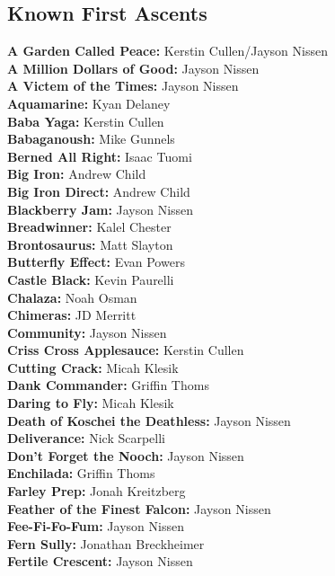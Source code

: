 \begin{flushleft}
\section{Known First Ascents}
\textbf{A Garden Called Peace:} Kerstin Cullen/Jayson Nissen\\
\textbf{A Million Dollars of Good:} Jayson Nissen\\
\textbf{A Victem of the Times:} Jayson Nissen\\
\textbf{Aquamarine:} Kyan Delaney\\
\textbf{Baba Yaga:} Kerstin Cullen\\
\textbf{Babaganoush:} Mike Gunnels\\
\textbf{Berned All Right:} Isaac Tuomi\\
\textbf{Big Iron:} Andrew Child\\
\textbf{Big Iron Direct:} Andrew Child\\
\textbf{Blackberry Jam:} Jayson Nissen\\
\textbf{Breadwinner:} Kalel Chester\\
\textbf{Brontosaurus:} Matt Slayton\\
\textbf{Butterfly Effect:} Evan Powers\\
\textbf{Castle Black:} Kevin Paurelli\\
\textbf{Chalaza:} Noah Osman\\
\textbf{Chimeras:} JD Merritt\\
\textbf{Community:} Jayson Nissen\\
\textbf{Criss Cross Applesauce:} Kerstin Cullen\\
\textbf{Cutting Crack:} Micah Klesik\\
\textbf{Dank Commander:} Griffin Thoms\\
\textbf{Daring to Fly:} Micah Klesik\\
\textbf{Death of Koschei the Deathless:} Jayson Nissen\\
\textbf{Deliverance:} Nick Scarpelli\\
\textbf{Don't Forget the Nooch:} Jayson Nissen\\
\textbf{Enchilada:} Griffin Thoms\\
\textbf{Farley Prep:} Jonah Kreitzberg\\
\textbf{Feather of the Finest Falcon:} Jayson Nissen\\
\textbf{Fee-Fi-Fo-Fum:} Jayson Nissen\\
\textbf{Fern Sully:} Jonathan Breckheimer\\
\textbf{Fertile Crescent:} Jayson Nissen\\

\end{flushleft}
